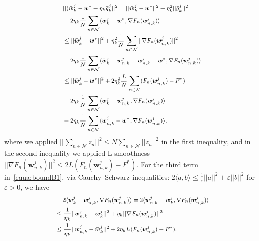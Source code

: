 \begin{equation} \label{equa:boundB1}
\footnotesize 
\begin{aligned} 
&||(\bar{\boldsymbol{w}}_k^j - \boldsymbol{w}^* -\eta_k\bar{g}_k^j||^2 
= ||\bar{\boldsymbol{w}}_k^j - \boldsymbol{w}^*||^2 + \eta_k^2||\bar{g}_k^j||^2 
\\& -2\eta_k \frac{1}{N} \sum_{n\in\mathcal{N}} \langle \bar{\boldsymbol{w}}_k^j - \boldsymbol{w}^*,\nabla F_{n}(\boldsymbol{w}_{n,k}^j)    \rangle
\\& \leq ||\bar{\boldsymbol{w}}_k^j - \boldsymbol{w}^*||^2 + \eta_k^2\frac{1}{N} \sum_{n\in\mathcal{N}}||\nabla F_{n}(\boldsymbol{w}_{n,k}^j)||^2 
\\&-2\eta_k \frac{1}{N} \sum_{n\in\mathcal{N}} \langle \bar{\boldsymbol{w}}_k^j - \boldsymbol{w}_{n,k}^j +\boldsymbol{w}_{n,k}^j - \boldsymbol{w}^*,\nabla F_{n}(\boldsymbol{w}_{n,k}^j)  \rangle
\\& \leq ||\bar{\boldsymbol{w}}_k^j - \boldsymbol{w}^*||^2 + 2\eta_k^2\frac{L}{N} \sum_{n\in\mathcal{N}} (F_{n}(\boldsymbol{w}_{n,k}^j) - F^*) 
\\&-2\eta_k \frac{1}{N} \sum_{n\in\mathcal{N}} \langle \bar{\boldsymbol{w}}_k^j - \boldsymbol{w}_{n,k}^j,\nabla F_{n}(\boldsymbol{w}_{n,k}^j) \rangle
\\&-2\eta_k \frac{1}{N} \sum_{n\in\mathcal{N}} \langle \boldsymbol{w}_{n,k}^j - \boldsymbol{w}^*,\nabla F_{n}(\boldsymbol{w}_{n,k}^j) \rangle,
\end{aligned}%
\end{equation}
where we applied $||\sum_{n\in\mathcal{N}} z_n||^2 \leq N\sum_{n\in\mathcal{N}} ||z_n||^2$ in the first inequality, and in the second inequality we applied  L-smoothness  $||\nabla F_{n}(\boldsymbol{w}_{n,k}^j)||^2 \leq 2L (F_{n}(\boldsymbol{w}_{n,k}^j) - F^*)$. For the third term in~\eqref{equa:boundB1}, via Cauchy–Schwarz  inequalities: $2\langle a,b \rangle \leq \frac{1}{\varepsilon}||a||^2 +\varepsilon||b||^2$ for $\varepsilon>0$, we have
\vspace{-5pt}
\begin{equation} 
\footnotesize
\begin{aligned}
& -2 \langle \bar{\boldsymbol{w}}_k^j - \boldsymbol{w}_{n,k}^j,\nabla F_{n}(\boldsymbol{w}_{n,k}^j) \rangle 
= 2 \langle \boldsymbol{w}_{n,k}^j - \bar{\boldsymbol{w}}_k^j,\nabla F_{n}(\boldsymbol{w}_{n,k}^j) \rangle 
\\&\leq \frac{1}{\eta_k} ||\boldsymbol{w}_{n,k}^j - \bar{\boldsymbol{w}}_k^j||^2 + \eta_k||\nabla F_{n}(\boldsymbol{w}_{n,k}^j)||^2
\\& \leq \frac{1}{\eta_k} ||\boldsymbol{w}_{n,k}^j - \bar{\boldsymbol{w}}_k^j||^2 + 2\eta_k L (F_{n}(\boldsymbol{w}_{n,k}^j) - F^*).
\end{aligned}
\end{equation}
